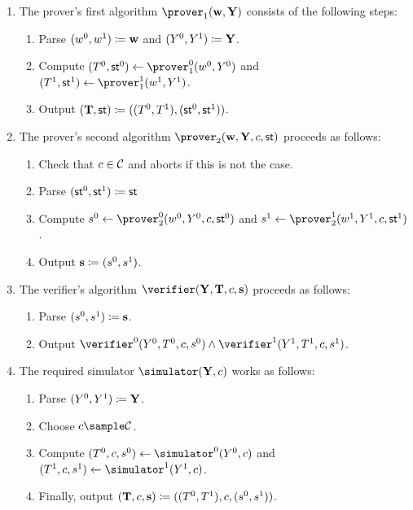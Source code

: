 \documentclass[runningheads,11pt]{article}
\begin{document}
\begin{enumerate}
  \item
    The prover's first algorithm $\prover_1(\vec \witness, \vec\statement)$ consists of the following steps:
    \begin{enumerate}
      \item
        Parse $(w^0,w^1)\coloneqq \mathbf {w}$ and $(Y^0,Y^1)\coloneqq \mathbf {Y}$.
      \item
        Compute $(\commitment^0,\st^0)\gets\prover_1^0(\witness^0, \statement^0)$ and $(\commitment^1,\st^1)\gets\prover_1^1(\witness^1, \statement^1)$.
      \item
	Output $(\mathbf {T},\mathsf{st}) \coloneqq ((T^0,  T^1),(\mathsf{st}^0,\mathsf{st}^1))$.
    \end{enumerate}
  \item
    The prover's second algorithm $\prover_2(\vec \witness,\vec \statement,\challenge,\st)$ proceeds as follows:
    \begin{enumerate}
      \item
        Check that $c\in\mathcal{C}$ and aborts if this is not the case.
      \item
	Parse $(\mathsf{st}^0,\mathsf{st}^1)\coloneqq \mathsf{st}$
      \item
        Compute $s^0\gets\prover_2^0(\witness^0,\statement^0,\challenge,\st^0)$ and $s^1\gets\prover_2^1(\witness^1,\statement^1,\challenge,\st^1)$.
      \item
        Output $\mathbf {s}\coloneqq(s^0,s^1)$.
    \end{enumerate}
  \item
    The verifier's algorithm $\verifier(\vec \statement, \vec \commitment,\challenge,\vec \response)$ proceeds as follows:
    \begin{enumerate}
      \item
        Parse $(s^0,s^1)\coloneqq \mathbf {s}$.
      \item
	Output $\verifier^0(\statement^0, \commitment^0,\challenge, \response^0)\land\verifier^1(\statement^1, \commitment^1,\challenge, \response^1)$.
    \end{enumerate}
  \item
    The required simulator $\simulator(\vec Y,c)$ works as follows:
    \begin{enumerate}
      \item
        Parse $(Y^0,Y^1)\coloneqq \mathbf Y$.
      \item
        Choose $\challenge\sample\CS$.
      \item
        Compute $(\commitment^0,\challenge,s^0)\gets\simulator^0(\statement^0,c)$ and $(\commitment^1,\challenge,s^1)\gets\simulator^1(\statement^1,c)$.
      \item
        Finally, output $(\mathbf {T},c, \mathbf {s})\coloneqq((T^0, T^1),c,(s^0,s^1))$.
    \end{enumerate}
\end{enumerate}
\end{document}
